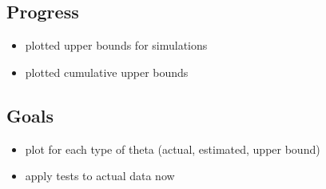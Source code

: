 \documentclass{article}
\begin{document}
\subsection{Progress}
\begin{itemize}
  \item plotted upper bounds for simulations
  \item plotted cumulative upper bounds
\end{itemize}

\subsection{Goals}
\begin{itemize}
  \item plot for each type of theta (actual, estimated, upper bound)
  \item apply tests to actual data now
\end{itemize}



\end{document}
